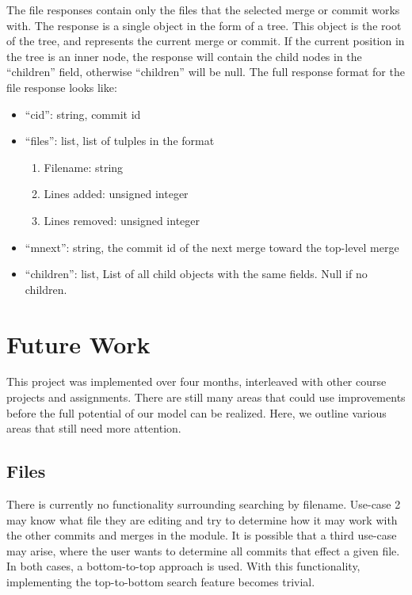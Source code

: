 \documentclass[conference, draftclsnofoot]{IEEEtran}
\begin{document}
The file responses contain only the files that the selected merge or commit
works with. The response is a single object in the form of a tree. This object
is the root of the tree, and represents the current merge or commit. If the
current position in the tree is an inner node, the response will contain the
child nodes in the ``children'' field, otherwise ``children'' will be null. The
full response format for the file response looks like:

\begin{itemize}
        \item ``cid'': string, commit id
        \item ``files'': list, list of tulples in the format
                \begin{enumerate}
                        \item Filename: string
                        \item Lines added: unsigned integer
                        \item Lines removed: unsigned integer
                \end{enumerate}
        \item ``mnext'': string, the commit id of the next merge toward the
                top-level merge
        \item ``children'': list, List of all child objects with the same
                fields. Null if no children.
\end{itemize}

\section{Future Work}
This project was implemented over four months, interleaved with other course
projects and assignments. There are still many areas that could use
improvements before the full potential of our model can be realized.
Here, we outline various areas that still need more attention.

\subsection{Files}
There is currently no functionality surrounding searching by filename. Use-case
2 may know what file they are editing and try to determine how it may work with
the other commits and merges in the module. It is possible that a third
use-case may arise, where the user wants to determine all commits that effect a
given file. In both cases, a bottom-to-top approach is used. With this
functionality, implementing the top-to-bottom search feature becomes trivial.
\end{document}
